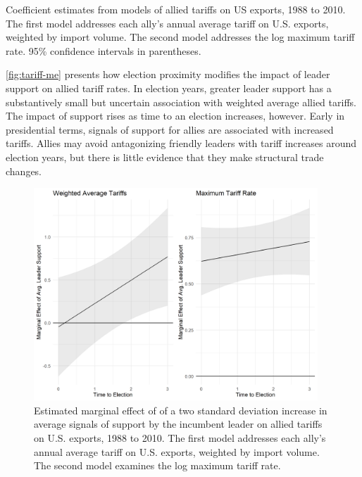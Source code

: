 \documentclass[12pt]{article}
\begin{document}
\begin{table}
\centering

	\caption{Coefficient estimates from models of allied tariffs on US exports, 1988 to 2010. The first model addresses each ally's annual average tariff on U.S. exports, weighted by import volume. The second model addresses the log maximum tariff rate. 95\% confidence intervals in parentheses.}
	\label{tab:tariff-model-coefs}
\end{table}


\autoref{fig:tariff-me} presents how election proximity modifies the impact of leader support on allied tariff rates.
In election years, greater leader support has a substantively small but uncertain association with weighted average allied tariffs. 
The impact of support rises as time to an election increases, however. 
Early in presidential terms, signals of support for allies are associated with increased tariffs. 
Allies may avoid antagonizing friendly leaders with tariff increases around election years, but there is little evidence that they make structural trade changes.


\begin{figure}[htpb]
	\centering
		\includegraphics[width=0.95\textwidth]{../figures/tariff-me.png}
	\caption{Estimated marginal effect of of a two standard deviation increase in average signals of support by the incumbent leader on allied tariffs on U.S. exports, 1988 to 2010. The first model addresses each ally's annual average tariff on U.S. exports, weighted by import volume. The second model examines the log maximum tariff rate.}
	\label{fig:tariff-me}
\end{figure}
\end{document}
